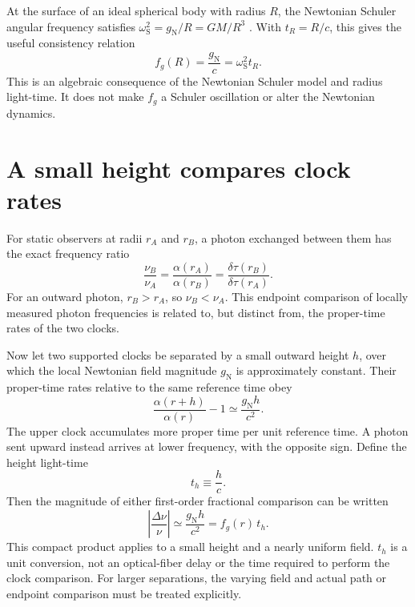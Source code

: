 \documentclass[12pt]{article}
\begin{document}
At the surface of an ideal spherical body with radius $R$, the Newtonian Schuler angular frequency satisfies $\omega_{\mathrm{S}}^2=g_{\mathrm{N}}/R=GM/R^3$ \cite{Schuler1923,WhittakerCrassidis}. With $t_R=R/c$, this gives the useful consistency relation
\begin{equation}
  f_g(R)=\frac{g_{\mathrm{N}}}{c}
  =\omega_{\mathrm{S}}^2t_R.
  \label{eq:schuler-check}
\end{equation}
This is an algebraic consequence of the Newtonian Schuler model and radius light-time. It does not make $f_g$ a Schuler oscillation or alter the Newtonian dynamics.

\section{A small height compares clock rates}

For static observers at radii $r_A$ and $r_B$, a photon exchanged between them has the exact frequency ratio
\begin{equation}
  \frac{\nu_B}{\nu_A}
  =\frac{\alpha(r_A)}{\alpha(r_B)}
  =\frac{\delta\tau(r_B)}{\delta\tau(r_A)}.
  \label{eq:photon-ratio}
\end{equation}
For an outward photon, $r_B>r_A$, so $\nu_B<\nu_A$. This endpoint comparison of locally measured photon frequencies is related to, but distinct from, the proper-time rates of the two clocks.

Now let two supported clocks be separated by a small outward height $h$, over which the local Newtonian field magnitude $g_{\mathrm{N}}$ is approximately constant. Their proper-time rates relative to the same reference time obey
\begin{equation}
  \frac{\alpha(r+h)}{\alpha(r)}-1
  \simeq\frac{g_{\mathrm{N}}h}{c^2}.
  \label{eq:clock-height}
\end{equation}
The upper clock accumulates more proper time per unit reference time. A photon sent upward instead arrives at lower frequency, with the opposite sign. Define the height light-time
\begin{equation}
  t_h\equiv\frac{h}{c}.
  \label{eq:height-lighttime}
\end{equation}
Then the magnitude of either first-order fractional comparison can be written
\begin{equation}
  \left|\frac{\Delta\nu}{\nu}\right|
  \simeq\frac{g_{\mathrm{N}}h}{c^2}
  =f_g(r)\,t_h.
  \label{eq:height-frequency}
\end{equation}
This compact product applies to a small height and a nearly uniform field. $t_h$ is a unit conversion, not an optical-fiber delay or the time required to perform the clock comparison. For larger separations, the varying field and actual path or endpoint comparison must be treated explicitly.
\end{document}
